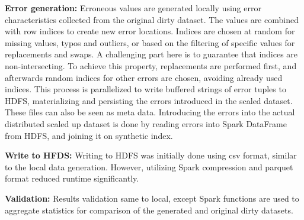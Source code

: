 \textbf{Error generation:} 
Erroneous values are generated locally using error characteristics collected from the original dirty dataset.
The values are combined with row indices to create new error locations.
Indices are chosen at random for missing values, typos and outliers, or based on the filtering of specific values for replacements and swaps.
A challenging part here is to guarantee that indices are non-intersecting. 
To achieve this property, replacements are performed first, and afterwards random indices for other errors are chosen, avoiding already used indices.
This process is parallelized to write buffered strings of error tuples to HDFS, materializing and persisting the errors introduced in the scaled dataset.
These files can also be seen as meta data.
Introducing the errors into the actual distributed scaled up dataset is done by reading errors into Spark DataFrame from HDFS, and joining it on synthetic index.

\textbf{Write to HFDS:} 
Writing to HDFS was initially done using csv format, similar to the local data generation.
However, utilizing Spark compression and parquet format reduced runtime significantly.

\textbf{Validation:}  
Results validation same to local, except Spark functions are used to aggregate statistics for comparison of the generated and original dirty datasets.



